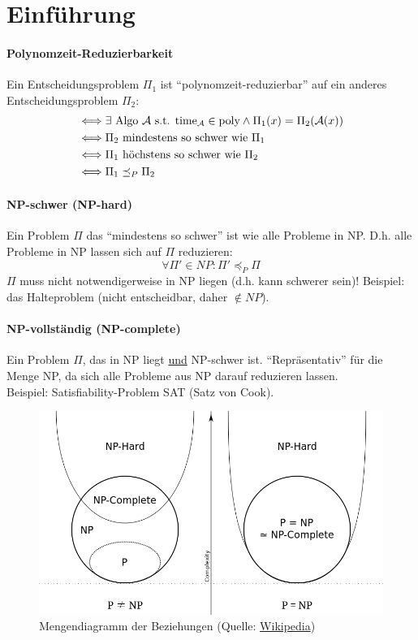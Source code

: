\section{Einführung}

\paragraph{Polynomzeit-Reduzierbarkeit}
Ein Entscheidungsproblem $\Pi_1$ ist ``polynomzeit-reduzierbar'' auf ein anderes
Entscheidungsproblem $\Pi_2$:
\begin{align*}
& \Longleftrightarrow
\exists \text{ Algo } \mathcal{A} \text{ s.t. } \text{time}_{\mathcal{A}} \in \text{poly}
\wedge \Pi_1(x) = \Pi_2(\mathcal{A}(x))
\\
& \Longleftrightarrow
\Pi_2 \text{ mindestens so schwer wie } \Pi_1
\\
& \Longleftrightarrow
\Pi_1 \text{ höchstens so schwer wie } \Pi_2
\\
& \Longleftrightarrow
\Pi_1 \preceq_P \Pi_2
\end{align*}

\paragraph{NP-schwer (NP-hard)}
Ein Problem $\Pi$ das ``mindestens so schwer'' ist wie alle Probleme in NP.
D.h. alle Probleme in NP lassen sich auf $\Pi$ reduzieren:
$$ \forall \Pi' \in NP : \Pi' \preceq_P \Pi $$
$\Pi$ muss nicht notwendigerweise in NP liegen (d.h. kann schwerer sein)!
Beispiel: das Halteproblem (nicht entscheidbar, daher $\notin NP$).

\paragraph{NP-vollständig (NP-complete)}
Ein Problem $\Pi$, das in NP liegt \underline{und} NP-schwer ist.
``Repräsentativ'' für die Menge NP, da sich alle Probleme aus NP darauf reduzieren lassen. \\
Beispiel: Satisfiability-Problem SAT (Satz von Cook).

\begin{figure}[h]
    \centering
	\includegraphics[scale=0.4]{images/np-hard-complete.png}
    \caption{Mengendiagramm der Beziehungen (Quelle: \href{https://commons.wikimedia.org/w/index.php?curid=3532181}{Wikipedia})}
    \label{fig:pke-ind-cca}
\end{figure}


